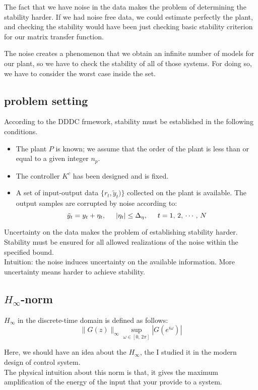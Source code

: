 The fact that we have noise in the data makes the problem of determining the stability harder. If we had noise free data, we could estimate perfectly the plant, and checking the stability would have been just checking basic stability criterion for our matrix transfer function.

The noise creates a phenomenon that we obtain an infinite number of models for our plant, so we have to check the stability of all of those systems. For doing so, we have to consider the worst case inside the set.



\subsection{problem setting}

According to the DDDC frmework, stability must be established in the following conditions.
\begin{itemize}
    \item The plant $P$ is known; we assume that the order of the plant is less than or equal to a given integer $n_p$.
    \item The controller $K^c$ has been designed and is fixed.
    \item A set of input-output data $\{r_t,\tilde{y}_t)\}$ collected on the plant is available. The output samples are corrupted by noise according to:
    \[
    \tilde{y}_t = y_t + \eta_t, \hspace{0.5cm} |\eta_t|\leq \Delta_\eta, \hspace{0.5cm} t=1,\,2,\,\cdots,\,N
    \]
\end{itemize}

Uncertainty on the data makes the problem of establishing stability harder. Stability must be ensured for all allowed realizations of the noise within the specified
bound.\\

Intuition: the noise induces uncertainty on the available information.
More uncertainty means harder to achieve stability.

\subsection{$H_\infty$-norm}
$H_\infty$ in the discrete-time domain is defined as follows:
\[
\|G(z)\|_\infty  \sup\limits_{\omega \in [0,\,2\pi]} |G(e^{i\omega})|
\]
\begin{factbox}
Here, we should have an idea about the $H_\infty$, the I studied it in the modern design of control system.\\

The physical intuition about this norm is that, it gives the maximum amplification of the energy of the input that your provide to a system.
\end{factbox}

